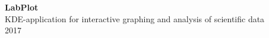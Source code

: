 \documentclass[
a4paper,
12pt,
twoside,
titlepage,
BCOR10mm,
openright,
parskip,
headsepline,
headinclude,
footsepline,
chapterprefix,
]{scrbook}
\begin{document}
\frontmatter
\begin{titlepage}
\centering
\textbf{\Huge{LabPlot}}\\
\vspace{3cm}
\LARGE{KDE-application for interactive graphing and analysis of scientific data}\\
\vspace{2cm}
\Large{2017}

\end{titlepage}

\tableofcontents

\mainmatter






\appendix


\backmatter
\end{document}
